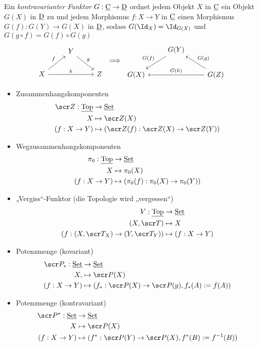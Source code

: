 \begin{df}
	Ein \emph{kontravarianter Funktor} $G: \underline{\mathrm{C}} \to \underline{\mathrm{D}}$ ordnet jedem Objekt $X$ in $\underline{\mathrm{C}}$ ein Objekt $G(X)$ in $\underline{\mathrm{D}}$ zu und jedem Morphismus $f: X \to Y$ in $\underline{\mathrm{C}}$ einen Morphismus $G(f) : G(Y) \to G(X)$ in $\underline{\mathrm{D}}$, sodass $G(\Id_X) = \Id_{G(X)}$ und $G(g\circ f) = G(f) \circ G(g)$
	\[
		\begin{tikzcd}
			~ & Y \arrow{dr}{g} & \\
			X \arrow{ur}{f} \arrow{rr}{h} & & Z
		\end{tikzcd}
		\implies
		\begin{tikzcd}
			~ & G(Y) \arrow[leftarrow]{dr}{G(g)} & \\
			G(X) \arrow[leftarrow]{ur}{G(f)} \arrow[leftarrow]{rr}{G(h)} & & G(Z)
		\end{tikzcd}
	\]
\end{df}

\begin{ex}
	\begin{itemize}
		\item
			Zusammenhangskomponenten
			\begin{align*}
				\scr Z: \Cat{Top} &\to \Cat{Set} \\
				X &\mapsto \scr Z(X) \\
				(f:X \to Y) &\mapsto (\scr Z(f): \scr Z(X) \to \scr Z(Y))
			\end{align*}
		\item
			Wegzusammenhangskomponenten
			\begin{align*}
				\pi_0: \underline{\mathrm{Top}} &\to \underline{\mathrm{Set}} \\
				X & \mapsto \pi_0(X) \\
				(f: X \to Y) &\mapsto (\pi_0(f): \pi_0(X) \to \pi_0(Y))
			\end{align*}
		\item
			„Vergiss“-Funktor (die Topologie wird „vergessen“)
			\begin{align*}
				V: \Cat{Top} &\to \Cat{Set} \\
				(X,\scr T) & \mapsto X \\
				(f: (X,\scr T_X) \to (Y, \scr T_Y)) &\mapsto (f: X \to Y)
			\end{align*}
		\item
			Potenzmenge (kovariant)
			\begin{align*}
				\scr P_*: \Cat{Set} & \to \Cat{Set} \\
				X, & \mapsto \scr P(X) \\
				(f: X \to Y) &\mapsto (f_*: \scr P(X) \to \scr P(y), f_*(A) := f(A))
			\end{align*}
		\item
			Potenzmenge (kontravariant)
			\begin{align*}
				\scr P^*: \Cat{Set} & \to \Cat{Set} \\
				X & \mapsto \scr P(X) \\
				(f: X \to Y) &\mapsto (f^*: \scr P(Y) \to \scr P(X), f^*(B) := f^{-1}(B))
			\end{align*}
	\end{itemize}
\end{ex}



